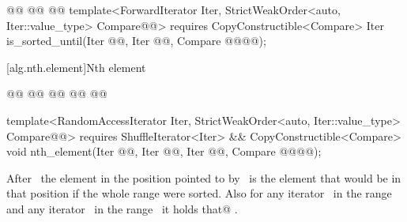 \documentclass[american,twoside]{book}
\begin{document}
\begin{paras}
\begin{itemdescr}
\pnum
{}
\end{itemdescr}

%
\begin{itemdecl}
@@
  @@
  @@
template<ForwardIterator Iter, 
         StrictWeakOrder<auto, Iter::value_type> Compare@@>
  requires CopyConstructible<Compare>
  Iter is_sorted_until(Iter @@, Iter @@,
                       Compare @@@@);
\end{itemdecl}
\color{black}

\begin{itemdescr}
\pnum
{}

\pnum
{}
\end{itemdescr}

[alg.nth.element]{Nth element}

%
\begin{itemdecl}
@@
  @@
        @@
  @@
                   @@

template<RandomAccessIterator Iter, 
         StrictWeakOrder<auto, Iter::value_type> Compare@@>
  requires ShuffleIterator<Iter>
        && CopyConstructible<Compare>
  void nth_element(Iter @@, Iter @@,
                   Iter @@,  Compare @@@@);
\end{itemdecl}\color{black}

\begin{itemdescr}
\pnum
After
\
the element in the position pointed to by \
is the element that would be
in that position if the whole range were sorted.
Also for any iterator
\tcode{i}\
in the range
and any iterator
\
in the range
\range{\farg{nth}}{\farg{last}}\
it holds that@\removedConcepts{:
\mbox{\tcode{!(*i > *j)}}
or}
.


\end{itemdescr}
\end{paras}
\end{document}
